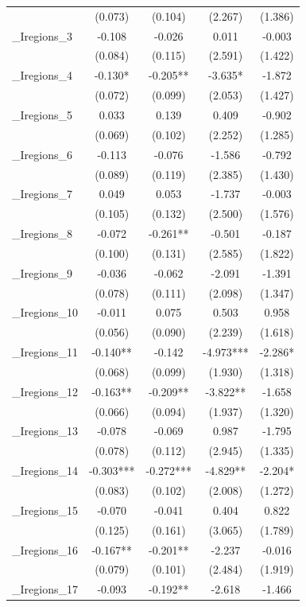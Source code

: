 \documentclass[]{article}
\begin{document}
\begin{tabular}{lcccc}
 & (0.073) & (0.104) & (2.267) & (1.386) \\
\_Iregions\_3 & -0.108 & -0.026 & 0.011 & -0.003 \\
 & (0.084) & (0.115) & (2.591) & (1.422) \\
\_Iregions\_4 & -0.130* & -0.205** & -3.635* & -1.872 \\
 & (0.072) & (0.099) & (2.053) & (1.427) \\
\_Iregions\_5 & 0.033 & 0.139 & 0.409 & -0.902 \\
 & (0.069) & (0.102) & (2.252) & (1.285) \\
\_Iregions\_6 & -0.113 & -0.076 & -1.586 & -0.792 \\
 & (0.089) & (0.119) & (2.385) & (1.430) \\
\_Iregions\_7 & 0.049 & 0.053 & -1.737 & -0.003 \\
 & (0.105) & (0.132) & (2.500) & (1.576) \\
\_Iregions\_8 & -0.072 & -0.261** & -0.501 & -0.187 \\
 & (0.100) & (0.131) & (2.585) & (1.822) \\
\_Iregions\_9 & -0.036 & -0.062 & -2.091 & -1.391 \\
 & (0.078) & (0.111) & (2.098) & (1.347) \\
\_Iregions\_10 & -0.011 & 0.075 & 0.503 & 0.958 \\
 & (0.056) & (0.090) & (2.239) & (1.618) \\
\_Iregions\_11 & -0.140** & -0.142 & -4.973*** & -2.286* \\
 & (0.068) & (0.099) & (1.930) & (1.318) \\
\_Iregions\_12 & -0.163** & -0.209** & -3.822** & -1.658 \\
 & (0.066) & (0.094) & (1.937) & (1.320) \\
\_Iregions\_13 & -0.078 & -0.069 & 0.987 & -1.795 \\
 & (0.078) & (0.112) & (2.945) & (1.335) \\
\_Iregions\_14 & -0.303*** & -0.272*** & -4.829** & -2.204* \\
 & (0.083) & (0.102) & (2.008) & (1.272) \\
\_Iregions\_15 & -0.070 & -0.041 & 0.404 & 0.822 \\
 & (0.125) & (0.161) & (3.065) & (1.789) \\
\_Iregions\_16 & -0.167** & -0.201** & -2.237 & -0.016 \\
 & (0.079) & (0.101) & (2.484) & (1.919) \\
\_Iregions\_17 & -0.093 & -0.192** & -2.618 & -1.466 \\

\end{tabular}
\end{document}
